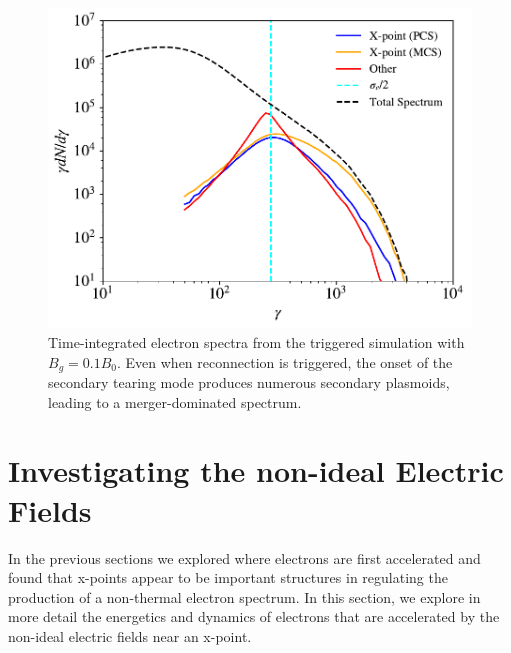 \documentclass[iop,twocolappendix]{emulateapj}
\begin{document}
\begin{figure}[htp]
	\includegraphics[width=\linewidth]{bguide1_triggered_withspec.pdf}
	\caption{Time-integrated electron spectra from the triggered simulation with $B_{g}=0.1B_{0}$.  Even when reconnection is triggered, the onset of the secondary tearing mode produces numerous secondary plasmoids, leading to a merger-dominated spectrum.}
	\label{triggered_bguide1_spec}
\end{figure}


\section{Investigating the non-ideal Electric Fields}\label{E_comps}
In the previous sections we explored where electrons are first accelerated and found that x-points appear to be important structures in regulating the production of a non-thermal electron spectrum.  In this section, we explore in more detail the energetics and dynamics of electrons that are accelerated by the non-ideal electric fields near an x-point. 
\end{document}
